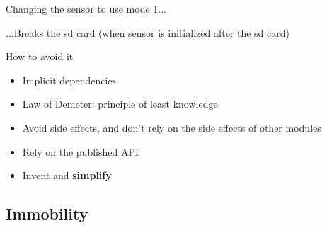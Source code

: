 \documentclass[xcolor=svgnames, handout]{beamer}
\begin{document}

{%
%
\begin{frame}{\subsecname}
    \begin{minipage}{\columnwidth}
    \end{minipage}
\end{frame}
}


{%
%
\begin{frame}{\subsecname}
    Changing the sensor to use mode 1...
    \begin{minipage}{\columnwidth}
    \end{minipage}
    ...Breaks the sd card (when sensor is initialized after the sd card)
\end{frame}
}


{%
%
\begin{frame}{\subsecname}

    How to avoid it
    \begin{itemize}
        \pause \item Implicit dependencies
        \pause \item Law of Demeter: principle of least knowledge
        \pause \item Avoid side effects, and don't rely on the side effects of
            other modules
        \pause \item Rely on the published API
        \pause \item Invent and \textbf{simplify}
    \end{itemize}
\end{frame}
}


\subsection{Immobility}
\end{document}
